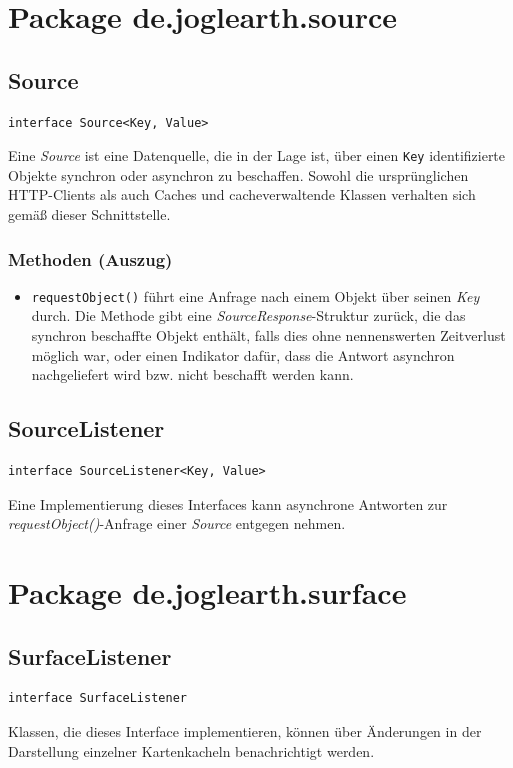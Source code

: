 \documentclass[10pt]{scrreprt}
\begin{document}
\vspace{5mm}
\section{Package de.joglearth.source}
\subsection*{Source}
\begin{lstlisting}
interface Source<Key, Value>
\end{lstlisting}
Eine \textit{Source} ist eine Datenquelle, die in der Lage ist, über einen \texttt{Key} identifizierte Objekte synchron oder asynchron zu beschaffen. Sowohl die ursprünglichen HTTP-Clients als auch Caches und cacheverwaltende Klassen verhalten sich gemäß dieser Schnittstelle.\\
\subsubsection*{Methoden (Auszug)}
\begin{itemize}
\item \texttt{requestObject()} führt eine Anfrage nach einem Objekt über seinen \textit{Key} durch. Die Methode gibt eine \textit{SourceResponse}-Struktur zurück, die das synchron beschaffte Objekt enthält, falls dies ohne nennenswerten Zeitverlust möglich war, oder einen Indikator dafür, dass die Antwort asynchron nachgeliefert wird bzw. nicht beschafft werden kann.
\end{itemize}

\vspace{5mm}
\subsection*{SourceListener}
\begin{lstlisting}
interface SourceListener<Key, Value>
\end{lstlisting}
Eine Implementierung dieses Interfaces kann asynchrone Antworten zur \textit{requestObject()}-Anfrage einer \textit{Source} entgegen nehmen.\\

\pagebreak
\section{Package de.joglearth.surface}
\subsection*{SurfaceListener}
\begin{lstlisting}
interface SurfaceListener
\end{lstlisting}
Klassen, die dieses Interface implementieren, können über Änderungen in der Darstellung einzelner Kartenkacheln benachrichtigt werden.\\
\end{document}
